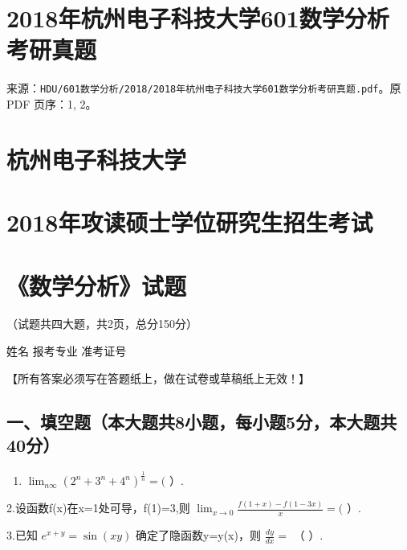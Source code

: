 \documentclass[11pt,fontset=fandol]{ctexart}
\providecommand{\tightlist}{\setlength{\itemsep}{0pt}\setlength{\parskip}{0pt}}
\begin{document}
\section{2018年杭州电子科技大学601数学分析考研真题}\label{ux5e74ux676dux5ddeux7535ux5b50ux79d1ux6280ux5927ux5b66601ux6570ux5b66ux5206ux6790ux8003ux7814ux771fux9898}

来源：\texttt{HDU/601数学分析/2018/2018年杭州电子科技大学601数学分析考研真题.pdf}。原
PDF 页序：1, 2。

\section{杭州电子科技大学}\label{ux676dux5ddeux7535ux5b50ux79d1ux6280ux5927ux5b66}

\section{2018年攻读硕士学位研究生招生考试}\label{ux5e74ux653bux8bfbux7855ux58ebux5b66ux4f4dux7814ux7a76ux751fux62dbux751fux8003ux8bd5}

\section{《数学分析》试题}\label{ux6570ux5b66ux5206ux6790ux8bd5ux9898}

（试题共四大题，共2页，总分150分）

姓名 报考专业 准考证号

【所有答案必须写在答题纸上，做在试卷或草稿纸上无效！】

\subsection{一、填空题（本大题共8小题，每小题5分，本大题共40分）}\label{ux4e00ux586bux7a7aux9898ux672cux5927ux9898ux51718ux5c0fux9898ux6bcfux5c0fux98985ux5206ux672cux5927ux9898ux517140ux5206}

\begin{enumerate}
\def\labelenumi{\arabic{enumi}.}
\tightlist
\item
  \(\lim _ { n  \infty } ( 2 ^ { n } + 3 ^ { n } + 4 ^ { n } ) ^ { \frac { 1 } { n } } = (\)
  ）.
\end{enumerate}

2.设函数f(x)在x=1处可导，f(1)=3,则
\(\lim _ { x \to 0 } { \frac { f ( 1 + x ) - f ( 1 - 3 x ) } { x } } = (\)
）.

3.已知 \(e ^ { x + y } = \sin ( x y )\) 确定了隐函数y=y(x)，则
\({ \frac { d y } { d x } } = { }\) （ ）.
\end{document}
